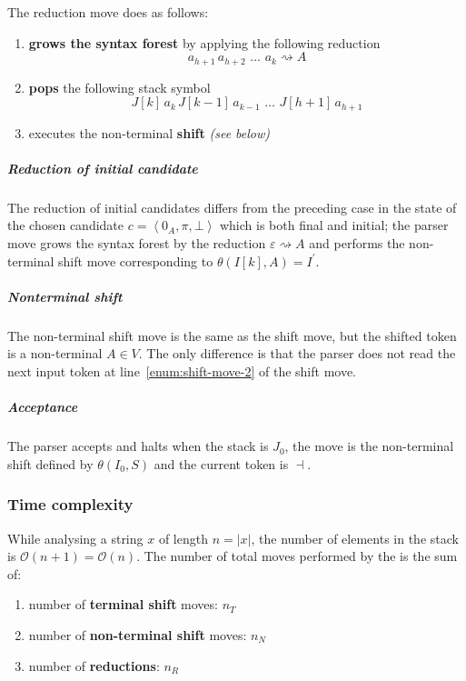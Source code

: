 \documentclass[english]{article}
\begin{document}
The reduction move does as follows:

\begin{enumerate}
  \item \textbf{grows the syntax forest} by applying the following reduction
        \[ a_{h+1} \, a_{h+2} \, \,\ldots\, \, a_k \rightsquigarrow A \]
  \item \textbf{pops} the following stack symbol
        \[ J[k] \, a_k \, J[k-1] \, a_{k-1} \, \,\ldots\, \, J[h+1] \, a_{h+1} \]
  \item executes the non-terminal \textbf{shift} \textit{(see below)}
\end{enumerate}

\subparagraph*{Reduction of initial candidate}
The reduction of initial candidates differs from the preceding case in the state of the chosen candidate \(c = \left\langle 0_A, \pi, \bot \right\rangle\) which is both final and initial;
the parser move grows the syntax forest by the reduction \(\varepsilon \rightsquigarrow A\) and performs the non-terminal shift move corresponding to \(\theta(I[k], A) = I^\prime\).

\subparagraph*{Nonterminal shift}
The non-terminal shift move is the same as the shift move, but the shifted token is a non-terminal \(A \in V\).
The only difference is that the parser does not read the next input token at line~\ref{enum:shift-move-2} of the shift move.

\subparagraph*{Acceptance}
The parser accepts and halts when the stack is \(J_0\), the move is the non-terminal shift defined by \(\theta(I_0, S)\) and the current token is \(\dashv\).

\subsubsection{Time complexity}

While analysing a string \(x\) of length \(n = |x|\), the number of elements in the stack is \(\mathcal{O}(n+1)=\mathcal{O}(n)\).
The number of total moves performed by the \PDA is the sum of:

\begin{enumerate}
  \item number of \textbf{terminal shift} moves: \(n_T\)
  \item number of \textbf{non-terminal shift} moves: \(n_N\)
  \item number of \textbf{reductions}: \(n_R\)
\end{enumerate}
\end{document}
